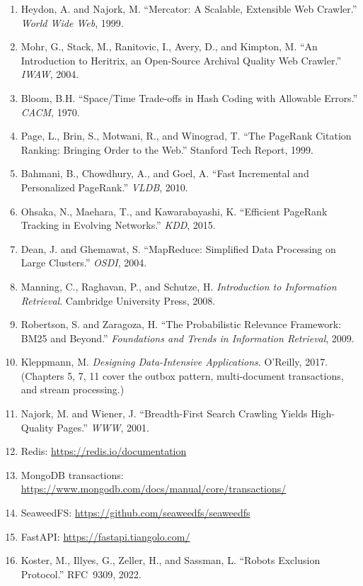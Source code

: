 \documentclass[11pt,a4paper]{article}
\begin{document}
\begin{enumerate}
  \item Heydon, A. and Najork, M. ``Mercator: A Scalable, Extensible Web Crawler.'' \emph{World Wide Web}, 1999.
  \item Mohr, G., Stack, M., Ranitovic, I., Avery, D., and Kimpton, M. ``An Introduction to Heritrix, an Open-Source Archival Quality Web Crawler.'' \emph{IWAW}, 2004.
  \item Bloom, B.H. ``Space/Time Trade-offs in Hash Coding with Allowable Errors.'' \emph{CACM}, 1970.
  \item Page, L., Brin, S., Motwani, R., and Winograd, T. ``The PageRank Citation Ranking: Bringing Order to the Web.'' Stanford Tech Report, 1999.
  \item Bahmani, B., Chowdhury, A., and Goel, A. ``Fast Incremental and Personalized PageRank.'' \emph{VLDB}, 2010.
  \item Ohsaka, N., Maehara, T., and Kawarabayashi, K. ``Efficient PageRank Tracking in Evolving Networks.'' \emph{KDD}, 2015.
  \item Dean, J. and Ghemawat, S. ``MapReduce: Simplified Data Processing on Large Clusters.'' \emph{OSDI}, 2004.
  \item Manning, C., Raghavan, P., and Schutze, H. \emph{Introduction to Information Retrieval}. Cambridge University Press, 2008.
  \item \label{ref:bm25} Robertson, S. and Zaragoza, H. ``The Probabilistic Relevance Framework: BM25 and Beyond.'' \emph{Foundations and Trends in Information Retrieval}, 2009.
  \item Kleppmann, M. \emph{Designing Data-Intensive Applications}. O'Reilly, 2017. (Chapters 5, 7, 11 cover the outbox pattern, multi-document transactions, and stream processing.)
  \item Najork, M. and Wiener, J. ``Breadth-First Search Crawling Yields High-Quality Pages.'' \emph{WWW}, 2001.
  \item Redis: \url{https://redis.io/documentation}
  \item MongoDB transactions: \url{https://www.mongodb.com/docs/manual/core/transactions/}
  \item SeaweedFS: \url{https://github.com/seaweedfs/seaweedfs}
  \item FastAPI: \url{https://fastapi.tiangolo.com/}
  \item Koster, M., Illyes, G., Zeller, H., and Sassman, L. ``Robots Exclusion Protocol.'' RFC~9309, 2022.
\end{enumerate}
\end{document}
